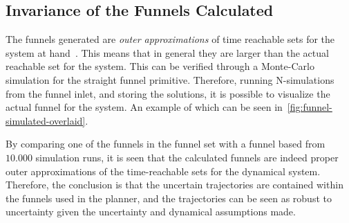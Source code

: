 \subsection{Invariance of the Funnels Calculated}

The funnels generated are \textit{outer approximations} of time reachable sets
for the system at hand~\cite{majumdarFunnelLibrariesRealtime2017}. This means
that in general they are larger than the actual reachable set for the system.
This can be verified through a Monte-Carlo simulation for the straight funnel
primitive. Therefore, running N-simulations from the funnel inlet, and storing
the solutions, it is possible to visualize the actual funnel for the system. An
example of which can be seen in~\cref{fig:funnel-simulated-overlaid}.

By comparing one of the funnels in the funnel set with a funnel based from
\(10.000\) simulation runs, it is seen that the calculated funnels are indeed
proper outer approximations of the time-reachable sets for the dynamical system.
Therefore, the conclusion is that the uncertain trajectories are contained
within the funnels used in the planner, and the trajectories can be seen as
robust to uncertainty given the uncertainty and dynamical assumptions made.

